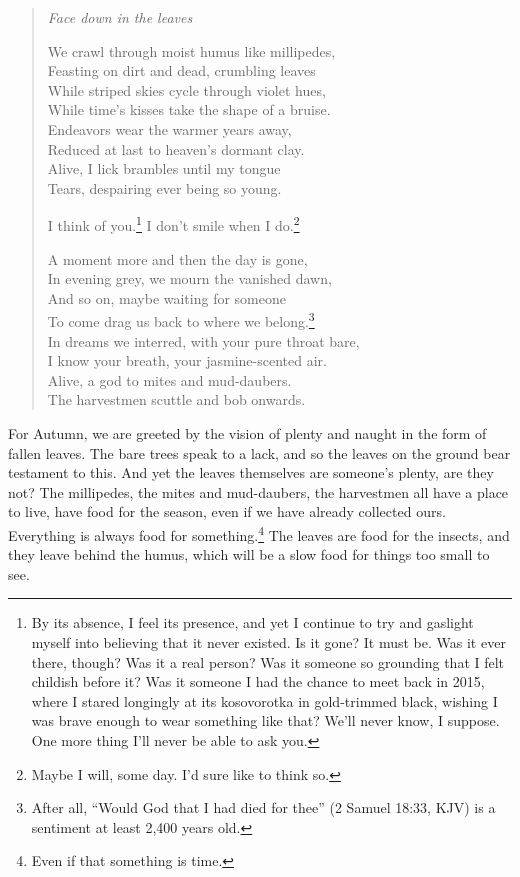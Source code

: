 \documentclass[12pt]{memoir}
\begin{document}
\begin{verse}
\emph{Face down in the leaves}

We crawl through moist humus like millipedes, \\
Feasting on dirt and dead, crumbling leaves \\
While striped skies cycle through violet hues, \\
While time's kisses take the shape of a bruise. \\
Endeavors wear the warmer years away, \\
Reduced at last to heaven's dormant clay. \\
Alive, I lick brambles until my tongue \\
Tears, despairing ever being so young.

I think of you.\footnote{By its absence, I feel its presence, and yet I continue to try and gaslight myself into believing that it never existed. Is it gone? It must be. Was it ever there, though? Was it a real person? Was it someone so grounding that I felt childish before it? Was it someone I had the chance to meet back in 2015, where I stared longingly at its kosovorotka in gold-trimmed black, wishing I was brave enough to wear something like that? We'll never know, I suppose. One more thing I'll never be able to ask you.} I don't smile when I do.\footnote{Maybe I will, some day. I'd sure like to think so.}

A moment more and then the day is gone, \\
In evening grey, we mourn the vanished dawn, \\
And so on, maybe waiting for someone \\
To come drag us back to where we belong.\footnote{After all, ``Would God that I had died for thee'' (2 Samuel 18:33, KJV) is a sentiment at least 2,400 years old.} \\
In dreams we interred, with your pure throat bare, \\
I know your breath, your jasmine-scented air. \\
Alive, a god to mites and mud-daubers. \\
The harvestmen scuttle and bob onwards.

\parencite[9]{leaves}
\end{verse}

For Autumn, we are greeted by the vision of plenty and naught in the form of fallen leaves. The bare trees speak to a lack, and so the leaves on the ground bear testament to this. And yet the leaves themselves are someone's plenty, are they not? The millipedes, the mites and mud-daubers, the harvestmen all have a place to live, have food for the season, even if we have already collected ours. Everything is always food for something.\footnote{Even if that something is time.} The leaves are food for the insects, and they leave behind the humus, which will be a slow food for things too small to see.
\end{document}
